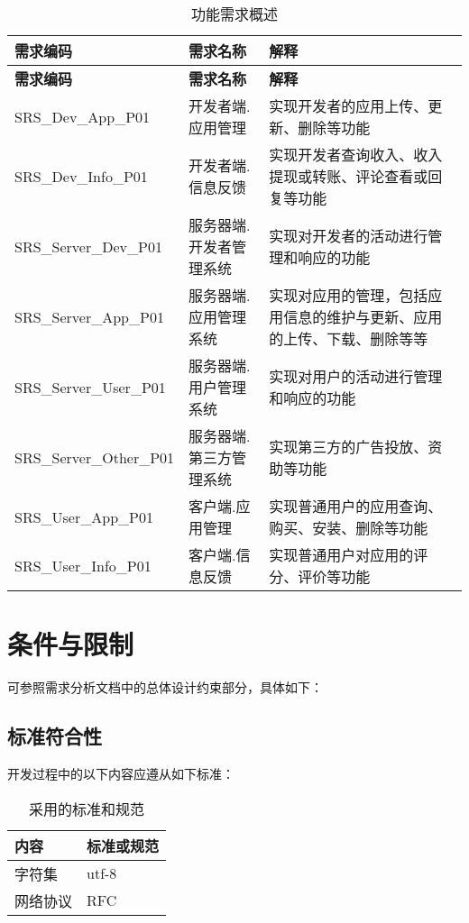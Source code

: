 \begin{longtable}{|p{4cm}|p{4cm}|p{6cm}}
    \caption{功能需求概述}\label{tab:requirements} \\
    \hline
\textbf{需求编码} & \textbf{需求名称} & \textbf{解释}\\
\hline
\endfirsthead
\hline
\textbf{需求编码} & \textbf{需求名称} & \textbf{解释}\\
\hline
\endhead
\hline 
\endfoot
\hline
\endlastfoot
        \hline
        SRS\_Dev\_App\_P01 & 开发者端.应用管理 & 实现开发者的应用上传、更新、删除等功能\\
        \hline
        SRS\_Dev\_Info\_P01 & 开发者端.信息反馈 & 实现开发者查询收入、收入提现或转账、评论查看或回复等功能\\
        \hline
        SRS\_Server\_Dev\_P01 & 服务器端.开发者管理系统 & 实现对开发者的活动进行管理和响应的功能\\
        \hline
        SRS\_Server\_App\_P01 & 服务器端.应用管理系统 & 实现对应用的管理，包括应用信息的维护与更新、应用的上传、下载、删除等等\\
        \hline
        SRS\_Server\_User\_P01 & 服务器端.用户管理系统 & 实现对用户的活动进行管理和响应的功能\\
        \hline
        SRS\_Server\_Other\_P01 & 服务器端.第三方管理系统 & 实现第三方的广告投放、资助等功能\\
        \hline
        SRS\_User\_App\_P01 & 客户端.应用管理 & 实现普通用户的应用查询、购买、安装、删除等功能\\
        \hline
        SRS\_User\_Info\_P01 & 客户端.信息反馈 & 实现普通用户对应用的评分、评价等功能\\
\end{longtable}


\section{条件与限制}
可参照需求分析文档中的总体设计约束部分，具体如下：

\subsection{标准符合性}
开发过程中的以下内容应遵从如下标准：\\
\begin{longtable}{|p{4cm}|p{6cm}|}
\caption{采用的标准和规范}\label{tab:standards_constraints} \\
\hline
内容 & 标准或规范\\
\hline
字符集 & utf-8\\
网络协议 & RFC\\
\hline
\end{longtable}

